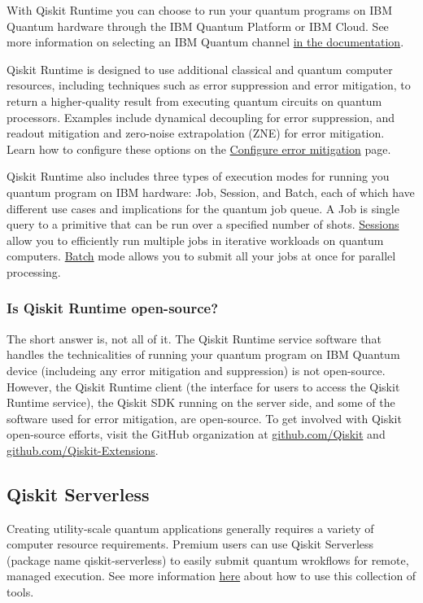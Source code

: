 \documentclass[12pt, oneside]{book}
\theoremstyle{definition}
\theoremstyle{definition}
\theoremstyle{remark}
\begin{document}
With Qiskit Runtime you can choose to run your quantum programs on IBM Quantum hardware through the IBM Quantum Platform or IBM Cloud. See more information on selecting an IBM Quantum channel \href{https://docs.quantum.ibm.com/guides/setup-channel}{in the documentation}.

Qiskit Runtime is designed to use additional classical and quantum computer resources, including techniques such as error suppression and error mitigation, to return a higher-quality result from executing quantum circuits on quantum processors. Examples include dynamical decoupling for error suppression, and readout mitigation and zero-noise extrapolation (ZNE) for error mitigation. Learn how to configure these options on the \href{https://docs.quantum.ibm.com/guides/configure-error-mitigation}{Configure error mitigation} page.

Qiskit Runtime also includes three types of execution modes for running you quantum program on IBM hardware: Job, Session, and Batch, each of which have different use cases and implications for the quantum job queue. A Job is single query to a primitive that can be run over a specified number of shots. \href{https://docs.quantum.ibm.com/guides/sessions}{Sessions} allow you to efficiently run multiple jobs in iterative workloads on quantum computers. \href{https://docs.quantum.ibm.com/guides/run-jobs-batch}{Batch} mode allows you to submit all your jobs at once for parallel processing.

\subsubsection{Is Qiskit Runtime open-source?}
The short answer is, not all of it.  The Qiskit Runtime service software that handles the technicalities of running your quantum program on IBM Quantum device (includeing any error mitigation and suppression) is not open-source. However, the Qiskit Runtime client (the interface for users to access the Qiskit Runtime service), the Qiskit SDK running on the server side, and some of the software used for error mitigation, are open-source. To get involved with Qiskit open-source efforts, visit the GitHub organization at \href{https://github.com/Qiskit}{github.com/Qiskit} and \href{https://github.com/Qiskit-Extensions/}{github.com/Qiskit-Extensions}.

\subsection{Qiskit Serverless}
Creating utility-scale quantum applications generally requires a variety of computer resource requirements. Premium users can use Qiskit Serverless (package name qiskit-serverless) to easily submit quantum wrokflows for remote, managed execution. See more information \href{https://docs.quantum.ibm.com/guides/qiskit-serverless}{here} about how to use this collection of tools.
\end{document}
